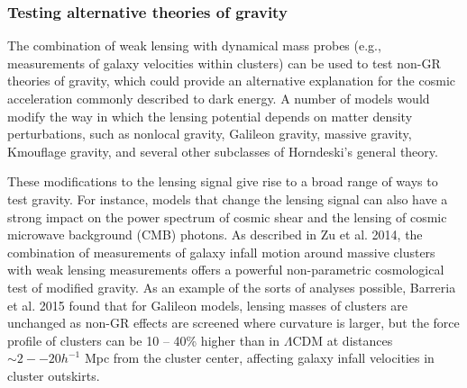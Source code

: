 \subsubsection{Testing alternative theories of gravity}

The combination of weak lensing with dynamical mass probes (e.g., measurements of galaxy velocities within clusters) can be used to test non-GR theories of gravity, which could provide an alternative explanation for the cosmic acceleration commonly described to dark energy.   A number of models would modify the way in which the lensing potential depends on matter density perturbations, such as nonlocal gravity, Galileon gravity, massive gravity, Kmouflage gravity, and several other subclasses of Horndeski's general theory.  

These modifications to the lensing signal give rise to a broad range of ways to test gravity.  For instance, models that change the lensing signal can also have a strong impact on the power spectrum of cosmic shear and the lensing of cosmic microwave background (CMB) photons.  
As described in Zu et al. 2014, the combination of measurements of galaxy
infall motion around massive clusters  with weak lensing measurements offers
a powerful non-parametric cosmological test of modified gravity.  As an example of the sorts of analyses possible, Barreria et al. 2015 found that for Galileon models, lensing masses of clusters are unchanged as non-GR effects are screened where curvature is larger, but the force profile of clusters can be 10 -- 40\% higher than in $\Lambda$CDM at distances $\sim 2 --20 h^{-1}$ Mpc from the cluster center, affecting galaxy infall velocities in cluster outskirts.   

